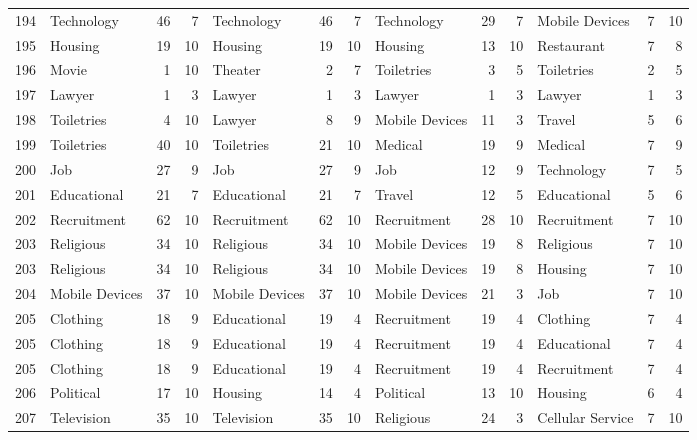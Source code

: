 \begin{figure}[htbp]
\begin{tabular}{rlrrlrrlrrlrr}
    194   & Technology & 46    & 7     & Technology & 46    & 7     & Technology & 29    & 7     & Mobile Devices & 7     & 10 \\
    195   & Housing & 19    & 10    & Housing & 19    & 10    & Housing & 13    & 10    & Restaurant & 7     & 8 \\
    196   & Movie & 1     & 10    & Theater & 2     & 7     & Toiletries & 3     & 5     & Toiletries & 2     & 5 \\
    197   & Lawyer & 1     & 3     & Lawyer & 1     & 3     & Lawyer & 1     & 3     & Lawyer & 1     & 3 \\
    198   & Toiletries & 4     & 10    & Lawyer & 8     & 9     & Mobile Devices & 11    & 3     & Travel & 5     & 6 \\
    199   & Toiletries & 40    & 10    & Toiletries & 21    & 10    & Medical & 19    & 9     & Medical & 7     & 9 \\
    200   & Job   & 27    & 9     & Job   & 27    & 9     & Job   & 12    & 9     & Technology & 7     & 5 \\
    201   & Educational & 21    & 7     & Educational & 21    & 7     & Travel & 12    & 5     & Educational & 5     & 6 \\
    202   & Recruitment & 62    & 10    & Recruitment & 62    & 10    & Recruitment & 28    & 10    & Recruitment & 7     & 10 \\
    203   & Religious & 34    & 10    & Religious & 34    & 10    & Mobile Devices & 19    & 8     & Religious & 7     & 10 \\
    203   & Religious & 34    & 10    & Religious & 34    & 10    & Mobile Devices & 19    & 8     & Housing & 7     & 10 \\
    204   & Mobile Devices & 37    & 10    & Mobile Devices & 37    & 10    & Mobile Devices & 21    & 3     & Job   & 7     & 10 \\
    205   & Clothing & 18    & 9     & Educational & 19    & 4     & Recruitment & 19    & 4     & Clothing & 7     & 4 \\
    205   & Clothing & 18    & 9     & Educational & 19    & 4     & Recruitment & 19    & 4     & Educational & 7     & 4 \\
    205   & Clothing & 18    & 9     & Educational & 19    & 4     & Recruitment & 19    & 4     & Recruitment & 7     & 4 \\
    206   & Political & 17    & 10    & Housing & 14    & 4     & Political & 13    & 10    & Housing & 6     & 4 \\
    207   & Television & 35    & 10    & Television & 35    & 10    & Religious & 24    & 3     & Cellular Service & 7     & 10 \\

\end{tabular}
\end{figure}

